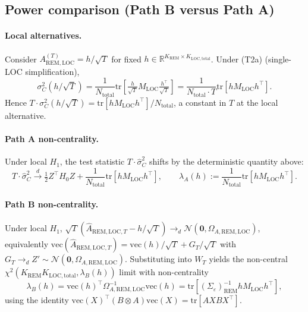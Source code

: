 \documentclass[11pt,letterpaper]{article}
\theoremstyle{remark}
\newcommand{\REM}{\mathrm{REM}}
\newcommand{\LOC}{\mathrm{LOC}}
\newcommand{\Sigmae}{\Sigma_\varepsilon}
\newcommand{\Mloc}{M_{\LOC}}
\newcommand{\Ntot}{N_{\mathrm{total}}}
\newcommand{\sigC}{\sigma^2_C}
\newcommand{\hatsigC}{\widehat{\sigma}^2_C}
\newcommand{\Ehat}{\widehat{A}}
\newcommand{\trace}{\mathrm{tr}}
\begin{document}
\subsection{Power comparison (Path B versus Path A)}

\paragraph{Local alternatives.} Consider $A_{\REM, \LOC}^{(T)} = h/\sqrt{T}$ for fixed $h \in \mathbb{R}^{K_\REM \times K_{\LOC, \mathrm{total}}}$. Under (T2a) (single-LOC simplification),
\begin{equation*}
\sigC(h/\sqrt{T}) = \frac{1}{\Ntot} \trace\!\left[\tfrac{h}{\sqrt T} \Mloc \tfrac{h^\top}{\sqrt T}\right] = \frac{1}{\Ntot \cdot T} \trace[h \Mloc h^\top].
\end{equation*}
Hence $T \cdot \sigC(h/\sqrt{T}) = \trace[h \Mloc h^\top] / \Ntot$, a constant in $T$ at the local alternative.

\paragraph{Path A non-centrality.} Under local $H_1$, the test statistic $T \cdot \hatsigC$ shifts by the deterministic quantity above:
\begin{equation*}
T \cdot \hatsigC \xrightarrow{d} \tfrac{1}{2} Z^\top H_0 Z + \frac{1}{\Ntot} \trace[h \Mloc h^\top], \qquad \lambda_A(h) := \frac{1}{\Ntot} \trace[h \Mloc h^\top].
\end{equation*}

\paragraph{Path B non-centrality.} Under local $H_1$, $\sqrt{T}(\Ehat_{\REM, \LOC, T} - h/\sqrt{T}) \to_d \mathcal{N}(\mathbf{0}, \Omega_{A, \REM, \LOC})$, equivalently $\mathrm{vec}(\Ehat_{\REM, \LOC, T}) = \mathrm{vec}(h)/\sqrt{T} + G_T/\sqrt{T}$ with $G_T \to_d Z' \sim \mathcal{N}(\mathbf{0}, \Omega_{A, \REM, \LOC})$. Substituting into $W_T$ yields the non-central $\chi^2(K_\REM K_{\LOC, \mathrm{total}}, \lambda_B(h))$ limit with non-centrality
\begin{equation*}
\lambda_B(h) = \mathrm{vec}(h)^\top \Omega^{-1}_{A, \REM, \LOC} \mathrm{vec}(h) = \trace\!\left[(\Sigmae)_\REM^{-1} h \Mloc h^\top\right],
\end{equation*}
using the identity $\mathrm{vec}(X)^\top (B \otimes A) \mathrm{vec}(X) = \trace[A X B X^\top]$.
\end{document}

